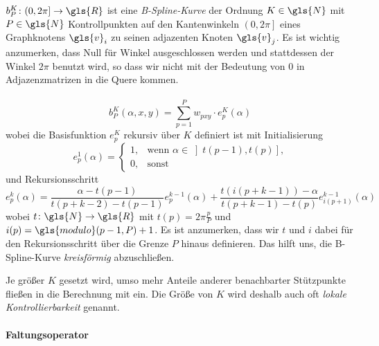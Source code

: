 $b_P^K \colon \left(0, 2\pi\right]\to\gls{R}$ ist eine \emph{B-Spline-Kurve} der Ordnung $K \in \gls{N}$ mit $P \in \gls{N}$ Kontrollpunkten auf den Kantenwinkeln $\left(0, 2\pi\right]$ eines Graphknotens $\gls{v}_i$ zu seinen adjazenten Knoten $\gls{v}_j$.
Es ist wichtig anzumerken, dass Null für Winkel ausgeschlossen werden und stattdessen der Winkel $2\pi$ benutzt wird, so dass wir nicht mit der Bedeutung von $0$ in Adjazenzmatrizen in die Quere kommen.
\\\\
\begin{equation}
  b_P^K\left(\alpha, x, y \right) = \sum_{p=1}^P w_{pxy} \cdot e_p^K\left(\alpha\right)
\end{equation}
wobei die Basisfunktion $e_p^K$ rekursiv über $K$ definiert ist mit Initialisierung
\begin{equation}
  e_p^1\left(\alpha\right) = \begin{cases}
    1, & \text{wenn }\alpha \in \left] t\left(p-1\right), t\left(p\right)\right]\text{,}\\
    0, & \text{sonst}
  \end{cases}
\end{equation}
und Rekursionsschritt
\begin{equation}
  e_p^k\left(\alpha\right) = \frac{\alpha - t\left(p - 1\right)}{t\left(p+k-2\right) - t\left(p - 1\right)} e_p^{k-1}\left(\alpha\right) + \frac{t\left(i\left(p + k - 1\right)\right) - \alpha}{t\left(p+k - 1\right) - t\left(p\right)} e_{i\left(p+1\right)}^{k-1}\left(\alpha\right)
\end{equation}
wobei $t \colon \gls{N} \to \gls{R}$ mit $t\left(p\right) = 2\pi\frac{p}{P}$ und $i\left(p\right) = \gls{modulo}\left(p-1, P\right) + 1$.
Es ist anzumerken, dass wir $t$ und $i$ dabei für den Rekursionsschritt über die Grenze $P$ hinaus definieren.
Das hilft uns, die B-Spline-Kurve \emph{kreisförmig} abzuschließen.

Je größer $K$ gesetzt wird, umso mehr Anteile anderer benachbarter Stützpunkte fließen in die Berechnung mit ein.
Die Größe von $K$ wird deshalb auch oft \emph{lokale Kontrollierbarkeit} genannt.

\paragraph{Faltungsoperator}
\label{ebener_faltungsoperator}
